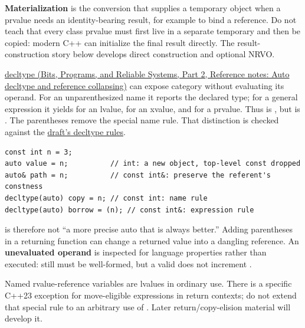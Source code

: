 \textbf{Materialization} is the conversion that supplies a temporary object when a prvalue needs an identity-bearing result, for example to bind a reference. Do not teach that every class prvalue must first live in a separate temporary and then be copied: modern C++ can initialize the final result directly. The result-construction story below develops direct construction and optional NRVO.

\href{../01-Bits-Programs-and-Reliable-Systems-P02/main.pdf\#nameddest=appendix-5d4252a42886}{decltype (Bits, Programs, and Reliable Systems, Part 2, Reference notes: Auto decltype and reference collapsing)} can expose category without evaluating its operand. For an unparenthesized name it reports the declared type; for a general expression it yields  for an lvalue,  for an xvalue, and  for a prvalue. Thus  is , but  is . The parentheses remove the special name rule. That distinction is checked against the \href{https://eel.is/c++draft/dcl.type.decltype}{draft's decltype rules}.

\begin{verbatim}
const int n = 3;
auto value = n;          // int: a new object, top-level const dropped
auto& path = n;          // const int&: preserve the referent's constness
decltype(auto) copy = n; // const int: name rule
decltype(auto) borrow = (n); // const int&: expression rule
\end{verbatim}

 is therefore not ``a more precise auto that is always better.'' Adding parentheses in a returning function can change a returned value into a dangling reference. An \textbf{unevaluated operand} is inspected for language properties rather than executed:  still must be well-formed, but a valid  does not increment .

Named rvalue-reference variables are lvalues in ordinary use. There is a specific C++23 exception for move-eligible expressions in return contexts; do not extend that special rule to an arbitrary use of . Later return/copy-elision material will develop it.

